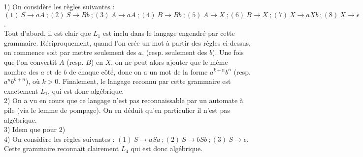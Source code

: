 \documentclass[11pt,a4paper]{article}
\begin{document}
1) On considère les règles suivantes : $(1) \ S \to aA  \ ; (2)  \ S \to Bb \ ; (3) \ A \to aA \ ; (4) \ B \to Bb \ ; (5) \ A \to X \ ; (6) \ B \to X \ ; (7) \ X \to aXb \ ; (8) \ X \to \epsilon$. \\ 
Tout d'abord, il est clair que $L_1$ est inclu dans le langage engendré par cette grammaire. Réciproquement, quand l'on crée un mot à partir des règles ci-dessus, on commence soit par mettre seulement des $a$, (resp. seulement des $b$). Une fois que l'on convertit $A$ (resp. $B$) en $X$, on ne peut alors ajouter que le même nombre des $a$ et de $b$ de chaque côté, donc on a un mot de la forme $a^{k+n}b^n$ (resp. $a^nb^{k+n}$), où $k>0$. Finalement, le langage reconnu par cette grammaire est exactement $L_1$, qui est donc algébrique.
\\

2) On a vu en cours que ce langage n'est pas reconnaissable par un automate à pile (via le lemme de pompage). On en déduit qu'en particulier il n'est pas algébrique. \\

3) Idem que pour 2) \\



4) On considère les règles suivantes : $ (1) \ S \to aSa \ ; (2) \ S \to bSb \ ; (3) \ S \to \epsilon$. \\ 
Cette grammaire reconnait clairement $L_4$ qui est donc algébrique.
\\
\end{document}
